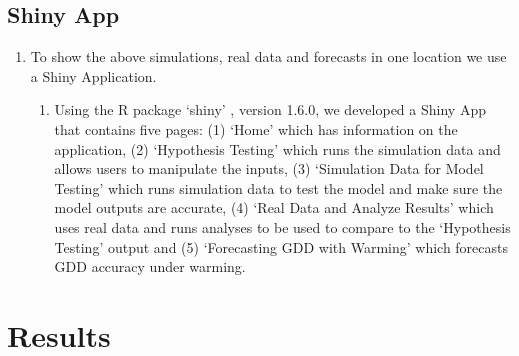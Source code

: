 \documentclass{article}\usepackage[]{graphicx}\usepackage[]{color}
\begin{document}
\begin{enumerate}
\subsection*{Shiny App}
\begin{enumerate}
\item To show the above simulations, real data and forecasts in one location we use a Shiny Application. 
  \begin{enumerate}
  \item Using the R package `shiny' \citep{shiny2021}, version 1.6.0, we developed a Shiny App that contains five pages: (1) `Home' which has information on the application, (2) `Hypothesis Testing' which runs the simulation data and allows users to manipulate the inputs, (3) `Simulation Data for Model Testing' which runs simulation data to test the model and make sure the model outputs are accurate, (4) `Real Data and Analyze Results' which uses real data and runs analyses to be used to compare to the `Hypothesis Testing' output and (5) `Forecasting GDD with Warming' which forecasts GDD accuracy under warming. 
  \end{enumerate}
\end{enumerate}

\section*{Results}

\end{enumerate}
\end{document}
